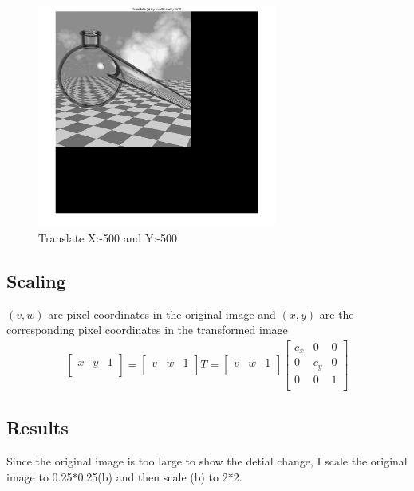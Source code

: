 \documentclass[11pt,oneside]{book}
\begin{document}
\begin{figure}[!htb]
   \centering  
   \includegraphics[width=0.7\textwidth]{images/6/translate__.jpg}
   \caption{Translate X:-500 and Y:-500}
\end{figure}
\newpage

\subsection{Scaling}
$(v, w)$ are pixel coordinates in the original image and $(x, y)$ are the corresponding pixel coordinates in the transformed image
\begin{align}
\left[               
  \begin{array}{ccc}  
    x & y & 1\\ 
  \end{array}
\right] 
=
\left[               
  \begin{array}{ccc}  
    v & w & 1\\ 
  \end{array}
\right]
T
=
\left[               
  \begin{array}{ccc}  
    v & w & 1\\ 
  \end{array}
\right]
\left[               
  \begin{array}{ccc}  
    c_x & 0 & 0\\
    0 & c_y & 0\\
    0 & 0 & 1\\ 
  \end{array}
\right]
\end{align}

\subsection{Results}
Since the original image is too large to show the detial change, I scale the original image to 0.25*0.25(b) and then scale (b) to 2*2.
\end{document}
